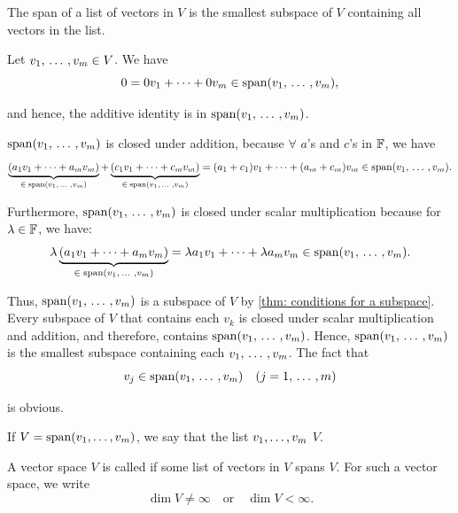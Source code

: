 \begin{thm} 
  \label{thm: the span of a list of vectors is a subspace}
  The span of a list of vectors in $V$ is the smallest subspace of $V$ containing all vectors in the list.
\end{thm}
\begin{prf}
  Let $v_1, {\, \ldots \,\,}, v_m \in V$. We have
  \begin{equation}
    0 = 0v_1 + \cdots + 0v_m \in \operatorname{span} (v_1, {\, \ldots \,\,}, v_m),
  \end{equation}

  and hence, the additive identity is in $\operatorname{span} (v_1, {\, \ldots \,\,}, v_m)$.

  $\operatorname{span} (v_1, {\, \ldots \,\,}, v_m)$ is closed under addition, because $\forall$ $a$'s and $c$'s in $\mathbb{F}$, we have
  \[
    \underbrace{(a_1 v_1 + \cdots + a_m v_m)}_{\in \; \operatorname{span} (v_1, {\, \ldots \,\,}, v_m)} + \underbrace{(c_1 v_1 + \cdots + c_m v_m)}_{\in \; \operatorname{span} (v_1, {\, \ldots \,\,}, v_m)} = (a_1 + c_1)v_1 + \cdots + (a_m + c_m)v_m \in \operatorname{span} (v_1, {\, \ldots \,\,}, v_m).
  \]

  Furthermore, $\operatorname{span} (v_1, {\, \ldots \,\,}, v_m)$ is closed under scalar multiplication because for $\lambda \in \mathbb{F}$, we have:
  \[
    \lambda \underbrace{(a_1 v_1 + \cdots + a_m v_m)}_{\in \; \operatorname{span} (v_1, {\, \ldots \,\,}, v_m)} = \lambda a_1 v_1 + \cdots + \lambda a_m v_m \in \operatorname{span} (v_1, {\, \ldots \,\,}, v_m).
  \]

  Thus, $\operatorname{span} (v_1, {\, \ldots \,\,}, v_m)$ is a subspace of $V$ by \ref{thm: conditions for a subspace}.
  Every subspace of $V$ that contains each $v_k$ is closed under scalar multiplication and addition, and therefore, contains $\operatorname{span} (v_1, {\, \ldots \,\,}, v_m)$. Hence, $\operatorname{span} (v_1, {\, \ldots \,\,}, v_m)$ is the smallest subspace containing each $v_1, {\, \ldots \,\,}, v_m$. The fact that
  \begin{equation}
    v_j \in \operatorname{span} (v_1, {\, \ldots \,\,}, v_m) \quad (j = 1, {\, \ldots \,\,}, m)
  \end{equation}

  is obvious.
\end{prf}


\begin{mydef} 
  If $V=\operatorname{span} (v_1, \dots, v_m)$, we say that the list $v_1, \dots, v_m$  $V$.
\end{mydef}

\setcounter{thm}{8}
\begin{mydef} 
  A vector space $V$ is called  if some list of vectors in $V$ spans $V$. For such a vector space, we write
  \begin{equation}
    \dim V \neq \infty \quad \text{or} \quad \dim V < \infty.
  \end{equation}
\end{mydef}


